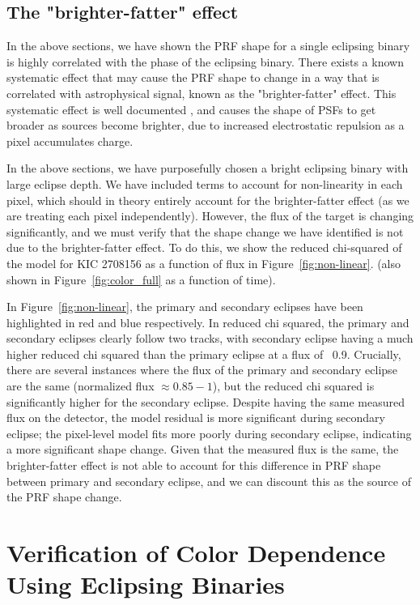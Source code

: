 \documentclass[iop]{emulateapj}
\newcommand{\target}{KIC 2708156\xspace}
\begin{document}
\subsection{The "brighter-fatter" effect}

In the above sections, we have shown the PRF shape for a single eclipsing binary is highly correlated with the phase of the eclipsing binary. There exists a known systematic effect that may cause the PRF shape to change in a way that is correlated with astrophysical signal, known as the "brighter-fatter" effect. This systematic effect is well documented \citep[e.g.][]{bf0, bf1, bf2}, and causes the shape of PSFs to get broader as sources become brighter, due to increased electrostatic repulsion as a pixel accumulates charge.

In the above sections, we have purposefully chosen a bright eclipsing binary with large eclipse depth. We have included terms to account for non-linearity in each pixel, which should in theory entirely account for the brighter-fatter effect (as we are treating each pixel independently). However, the flux of the target is changing significantly, and we must verify that the shape change we have identified is not due to the brighter-fatter effect. To do this, we show the reduced chi-squared of the model for \target as a function of flux in Figure~\ref{fig:non-linear}. (also shown in Figure~\ref{fig:color_full} as a function of time).  

In Figure~\ref{fig:non-linear}, the primary and secondary eclipses have been highlighted in red and blue respectively. In reduced chi squared, the primary and secondary eclipses clearly follow two tracks, with secondary eclipse having a much higher reduced chi squared than the primary eclipse at a flux of ~0.9. Crucially, there are several instances where the flux of the primary and secondary eclipse are the same (normalized flux $\approx0.85 - 1$), but the reduced chi squared is significantly higher for the secondary eclipse. Despite having the same measured flux on the detector, the model residual is more significant during secondary eclipse; the pixel-level model fits more poorly during secondary eclipse, indicating a more significant shape change. Given that the measured flux is the same, the brighter-fatter effect is not able to account for this difference in PRF shape between primary and secondary eclipse, and we can discount this as the source of the PRF shape change. 



\section{Verification of Color Dependence Using Eclipsing Binaries}
\label{sec:EBs}
\end{document}
